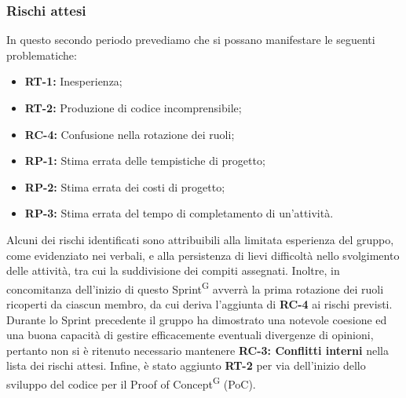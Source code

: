 \documentclass[8pt]{article}
\newcommand{\glossterm}[1]{#1\textsuperscript{G}} %
\begin{document}
\subsubsection{Rischi attesi}
In questo secondo periodo prevediamo che si possano manifestare le seguenti problematiche: 
\begin{itemize}
\setlength{\itemsep}{0em}
\item \textbf{RT-1:} Inesperienza;
\item \textbf{RT-2:} Produzione di codice incomprensibile;
\item \textbf{RC-4:} Confusione nella rotazione dei ruoli;
\item \textbf{RP-1:} Stima errata delle tempistiche di progetto;
\item \textbf{RP-2:} Stima errata dei costi di progetto;
\item \textbf{RP-3:} Stima errata del tempo di completamento di un'attività.
\end{itemize}
Alcuni dei rischi identificati sono attribuibili alla limitata esperienza del gruppo, come evidenziato nei verbali, e alla persistenza di lievi difficoltà nello svolgimento delle attività, tra cui la suddivisione dei compiti assegnati. Inoltre, in concomitanza dell'inizio di questo \glossterm{Sprint} avverrà la prima rotazione dei ruoli ricoperti da ciascun membro, da cui deriva l'aggiunta di \textbf{RC-4} ai rischi previsti. Durante lo Sprint precedente il gruppo ha dimostrato una notevole coesione ed una buona capacità di gestire efficacemente eventuali divergenze di opinioni, pertanto non si è ritenuto necessario mantenere \textbf{RC-3: Conflitti interni} nella lista dei rischi attesi. Infine, è stato aggiunto \textbf{RT-2} per via dell'inizio dello sviluppo del codice per il \glossterm{Proof of Concept} (PoC).
\clearpage
\end{document}
